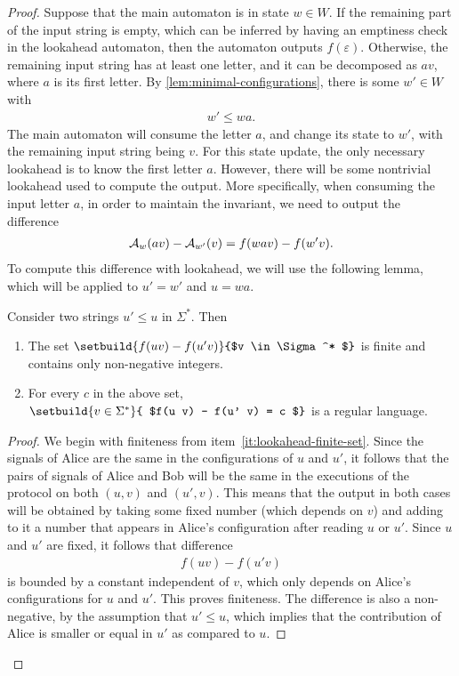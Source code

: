 \begin{proof}
Suppose that the main automaton is in state $w \in W$. If the remaining part of the input string is empty, which can be inferred by having an emptiness check in the lookahead automaton, then the automaton outputs $f(\varepsilon)$. Otherwise, the remaining input string has at least one letter, and it can be decomposed as $av$, where $a$ is its first letter.  By \cref{lem:minimal-configurations}, there is some $w' \in W$ with
\begin{align*}
w' \leq wa.
\end{align*}
The main automaton will consume the letter $a$, and change its state to  $w'$, with the remaining input string being $v$. For this state update, the only necessary lookahead is to know the first letter $a$. However, there will be some nontrivial lookahead used to compute the output. More specifically, when consuming the input letter $a$, in order to maintain the invariant, we  need to output the difference 
\begin{align}
  \label{eq:unary-difference-output}
\Aa_{w}(av) - \Aa_{w'}(v)  = f(wa v) -  f(w' v).
\end{align}
To compute this difference with lookahead, we will use the following lemma, which will be applied to $u' = w'$ and $u = wa$.



\begin{lemma}\label{lem:lookahead-regular-languages}
  Consider two strings $u' \leq u$ in $\Sigma^*$. Then
  \begin{enumerate}
    \item \label{it:lookahead-finite-set} The set $\setbuild{ f(uv) - f(u' v)}{$v \in \Sigma^* $}$ is finite and contains only non-negative integers.
    \item \label{it:lookahead-regular-language} For every $c$ in the above set, $\setbuild{ v \in \Sigma^*}{ $f(u v) - f(u' v) = c $}$ is a regular language.
  \end{enumerate}
\end{lemma}
\begin{proof}
  We begin with finiteness  from item~\ref{it:lookahead-finite-set}. Since the signals of Alice are the same in the configurations of $u$ and $u'$, it follows that the pairs of signals of Alice and Bob will be the same in the executions of the protocol on both $(u,v)$ and $(u',v)$. This means that the output in both cases will be obtained by taking some fixed number (which depends on $v$) and adding to it a number that appears in Alice's configuration after reading $u$ or $u'$. Since $u$ and $u'$ are fixed, it follows that difference 
  \begin{align*}
  f(uv) - f(u'v)
  \end{align*}
  is bounded by a constant independent of $v$, which only depends on Alice's configurations for $u$ and $u'$. This proves finiteness. The difference is also a non-negative, by the assumption that $u' \leq u$, which implies that the contribution of Alice is smaller or equal in $u'$ as compared to $u$.


\end{proof}
\end{proof}
